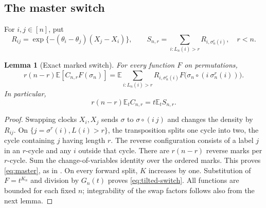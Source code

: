 \documentclass[11pt]{article}
\numberwithin{equation}{section}
\newtheorem{lemma}[theorem]{Lemma}
\theoremstyle{definition}
\theoremstyle{remark}
\newcommand{\E}{\mathbb E}
\begin{document}
\subsection{The master switch}
For $i,j\in[n]$, put
\begin{equation}\label{eq:R}
 R_{ij}=\exp\{-(\theta_i-\theta_j)(X_j-X_i)\},\qquad
 S_{n,r}=\sum_{i:L_n(i)>r}R_{i,\sigma_n^r(i)},\quad r<n.
\end{equation}

\begin{lemma}[Exact marked switch]\label{lem:switch}
For every function $F$ on permutations,
\begin{equation}\label{eq:master}
 r(n-r)\E[C_{n,r}F(\sigma_n)]
 =\E\sum_{i:L_n(i)>r}R_{i,\sigma_n^r(i)}
 F\bigl(\sigma_n\circ(i\ \sigma_n^r(i))\bigr).
\end{equation}
In particular,
\begin{equation}\label{eq:tilted-switch}
 r(n-r)\E_tC_{n,r}=t\E_tS_{n,r}.
\end{equation}
\end{lemma}
\begin{proof}
Swapping clocks $X_i,X_j$ sends $\sigma$ to $\sigma\circ(i\ j)$ and changes the density by $R_{ij}$. On $\{j=\sigma^r(i),L(i)>r\}$, the transposition splits one cycle into two, the cycle containing $j$ having length $r$. The reverse configuration consists of a label $j$ in an $r$-cycle and any $i$ outside that cycle. There are $r(n-r)$ reverse marks per $r$-cycle. Sum the change-of-variables identity over the ordered marks. This proves \eqref{eq:master}, as in \cite[Marked master switching identity]{LongMeso}. On every forward split, $K$ increases by one. Substitution of $F=t^{K_n}$ and division by $G_n(t)$ proves \eqref{eq:tilted-switch}. All functions are bounded for each fixed $n$; integrability of the swap factors follows also from the next lemma.
\end{proof}
\end{document}
